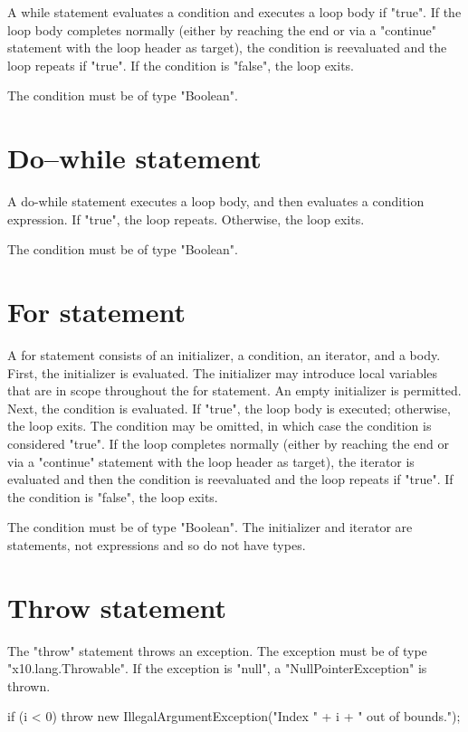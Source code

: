 A while statement evaluates a condition and executes a loop body
if \xcd"true".  If the loop body completes normally (either by reaching
the end or via a \xcd"continue" statement with the loop header
as target), the condition is reevaluated and the loop repeats if
\xcd"true".  If the condition is \xcd"false", the loop
exits.

The condition must be of type \xcd"Boolean".

\section{Do--while statement}

A do-while statement executes a loop body, and then evaluates a
condition expression.  If \xcd"true", the loop repeats.
Otherwise, the loop exits.

The condition must be of type \xcd"Boolean".

\section{For statement}

A for statement consists of an initializer, a condition, an
iterator, and a body.  First, the initializer is evaluated.
The initializer may introduce local variables that are in scope
throughout the for statement.  An empty initializer is
permitted.
Next, the condition is evaluated.  If \xcd"true", the loop body
is executed; otherwise, the loop exits.
The condition may be omitted, in which case the condition is
considered \xcd"true".
If the loop completes normally (either by reaching the end
or via a \xcd"continue" statement with the loop header as
target),
the iterator is evaluated and then the condition is reevaluated
and the loop repeats if
\xcd"true".  If the condition is \xcd"false", the loop
exits.

The condition must be of type \xcd"Boolean".
The initializer and iterator are statements, not expressions
and so do not have types.

\section{Throw statement}

The \xcd"throw" statement throws an exception.  The exception
must be of type \xcd"x10.lang.Throwable".  If the exception is
\xcd"null", a \xcd"NullPointerException" is thrown.

\begin{example}
\begin{xten}
if (i < 0) 
    throw new IllegalArgumentException("Index " + i + " out of bounds.");
\end{xten}
\end{example}


